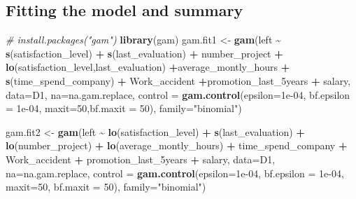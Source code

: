 \documentclass[
  11pt,
]{article}
\newenvironment{Shaded}{\begin{snugshade}}{\end{snugshade}}
\newcommand{\AttributeTok}[1]{\textcolor[rgb]{0.13,0.29,0.53}{#1}}
\newcommand{\CommentTok}[1]{\textcolor[rgb]{0.56,0.35,0.01}{\textit{#1}}}
\newcommand{\DecValTok}[1]{\textcolor[rgb]{0.00,0.00,0.81}{#1}}
\newcommand{\FloatTok}[1]{\textcolor[rgb]{0.00,0.00,0.81}{#1}}
\newcommand{\FunctionTok}[1]{\textcolor[rgb]{0.13,0.29,0.53}{\textbf{#1}}}
\newcommand{\NormalTok}[1]{#1}
\newcommand{\OtherTok}[1]{\textcolor[rgb]{0.56,0.35,0.01}{#1}}
\newcommand{\SpecialCharTok}[1]{\textcolor[rgb]{0.81,0.36,0.00}{\textbf{#1}}}
\newcommand{\StringTok}[1]{\textcolor[rgb]{0.31,0.60,0.02}{#1}}
\begin{document}
\subsection{Fitting the model and summary}

\begin{Shaded}
\begin{Highlighting}[]
\CommentTok{\# install.packages("gam")}
\FunctionTok{library}\NormalTok{(gam)}
\NormalTok{gam.fit1 }\OtherTok{\textless{}{-}} \FunctionTok{gam}\NormalTok{(left }\SpecialCharTok{\textasciitilde{}} \FunctionTok{s}\NormalTok{(satisfaction\_level) }\SpecialCharTok{+} \FunctionTok{s}\NormalTok{(last\_evaluation) }\SpecialCharTok{+}\NormalTok{ number\_project }
                \SpecialCharTok{+} \FunctionTok{lo}\NormalTok{(satisfaction\_level,last\_evaluation) }\SpecialCharTok{+}\NormalTok{average\_montly\_hours }
                \SpecialCharTok{+} \FunctionTok{s}\NormalTok{(time\_spend\_company) }\SpecialCharTok{+}\NormalTok{ Work\_accident }\SpecialCharTok{+}\NormalTok{promotion\_last\_5years }\SpecialCharTok{+}
\NormalTok{                  salary, }\AttributeTok{data=}\NormalTok{D1, }\AttributeTok{na=}\NormalTok{na.gam.replace, }
                \AttributeTok{control =} \FunctionTok{gam.control}\NormalTok{(}\AttributeTok{epsilon=}\FloatTok{1e{-}04}\NormalTok{, }\AttributeTok{bf.epsilon =} \FloatTok{1e{-}04}\NormalTok{,}
                                      \AttributeTok{maxit=}\DecValTok{50}\NormalTok{,}\AttributeTok{bf.maxit =} \DecValTok{50}\NormalTok{), }\AttributeTok{family=}\StringTok{"binomial"}\NormalTok{)}

\NormalTok{gam.fit2 }\OtherTok{\textless{}{-}} \FunctionTok{gam}\NormalTok{(left }\SpecialCharTok{\textasciitilde{}} \FunctionTok{lo}\NormalTok{(satisfaction\_level) }\SpecialCharTok{+} \FunctionTok{s}\NormalTok{(last\_evaluation) }\SpecialCharTok{+} \FunctionTok{lo}\NormalTok{(number\_project)}
                \SpecialCharTok{+} \FunctionTok{lo}\NormalTok{(average\_montly\_hours) }\SpecialCharTok{+}\NormalTok{ time\_spend\_company }\SpecialCharTok{+}\NormalTok{ Work\_accident }\SpecialCharTok{+}
\NormalTok{                  promotion\_last\_5years  }\SpecialCharTok{+}\NormalTok{ salary, }\AttributeTok{data=}\NormalTok{D1, }\AttributeTok{na=}\NormalTok{na.gam.replace, }
                \AttributeTok{control =} \FunctionTok{gam.control}\NormalTok{(}\AttributeTok{epsilon=}\FloatTok{1e{-}04}\NormalTok{, }\AttributeTok{bf.epsilon =} \FloatTok{1e{-}04}\NormalTok{, }\AttributeTok{maxit=}\DecValTok{50}\NormalTok{, }
                                      \AttributeTok{bf.maxit =} \DecValTok{50}\NormalTok{), }\AttributeTok{family=}\StringTok{"binomial"}\NormalTok{)}
\end{Highlighting}
\end{Shaded}
\end{document}
